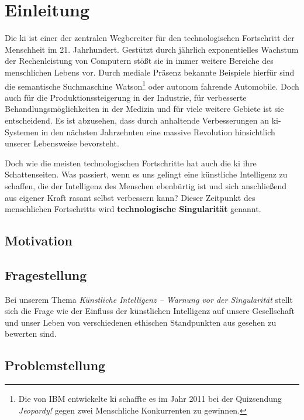 \section{Einleitung}
Die \ac{ki} ist einer der zentralen Wegbereiter für den technologischen Fortschritt der Menschheit im 21. Jahrhundert.
Gestützt durch jährlich exponentielles Wachstum der Rechenleistung von Computern stößt sie in immer weitere Bereiche des menschlichen Lebens vor.
Durch mediale Präsenz bekannte Beispiele hierfür sind die semantische Suchmaschine Watson\footnote{Die von IBM entwickelte \ac{ki} schaffte es im Jahr 2011 bei der Quizsendung \textit{Jeopardy!} gegen zwei Menschliche Konkurrenten zu gewinnen.} oder autonom fahrende Automobile. %
Doch auch für die Produktionssteigerung in der Industrie, für verbesserte Behandlungsmöglichkeiten in der Medizin und für viele weitere Gebiete ist sie entscheidend.
Es ist abzusehen, dass durch anhaltende Verbesserungen an \ac{ki}-Systemen in den nächsten Jahrzehnten eine massive Revolution hinsichtlich unserer Lebensweise bevorsteht.

Doch wie die meisten technologischen Fortschritte hat auch die \ac{ki} ihre Schattenseiten.
Was passiert, wenn es uns gelingt eine künstliche Intelligenz zu schaffen, die der Intelligenz des Menschen ebenbürtig ist und sich anschließend aus eigener Kraft rasant selbst verbessern kann?
Dieser Zeitpunkt des menschlichen Fortschritts wird \textbf{technologische Singularität} genannt.

\subsection{Motivation}




\subsection{Fragestellung}
Bei unserem Thema \textit{Künstliche Intelligenz -- Warnung vor der Singularität} stellt sich die Frage wie der Einfluss der künstlichen Intelligenz auf unsere Gesellschaft und unser Leben von verschiedenen ethischen Standpunkten aus gesehen zu bewerten sind.


\subsection{Problemstellung}
